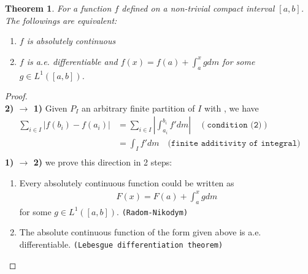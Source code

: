 \documentclass[a4paper,11pt,fleqn]{book}
\newtheorem{theorem}{Theorem}[section]
\theoremstyle{definition}
\theoremstyle{remark}
\begin{document}
\begin{theorem}
For a function $f$ defined on a non-trivial compact interval $[a, b]$. The followings are equivalent:
\begin{enumerate}
	\item $f$ is absolutely continuous
	\item $f$ is a.e. differentiable and $f(x) = f(a) + \int_a^x gdm$ for some $g \in L^1([a, b])$. 
\end{enumerate}
\end{theorem}
\begin{proof}\quad\\
\textbf{2) $\rightarrow$ 1)}
Given $P_I$ an arbitrary finite partition of $I$ with , we have
\begin{align*}
	\sum_{i \in I} |f(b_i) - f(a_i)| &= \sum_{i \in I}|\int_{a_i}^{b_i} f'dm|\quad(\texttt{condition (2)})\\
	&= \int_If'dm \quad \texttt{(finite additivity of integral)}  \\
	&
\end{align*}
\textbf{1) $\rightarrow$ 2)} we prove this direction in 2 steps:
\begin{enumerate}
	\item Every absolutely continuous function could be written as 
		\begin{align*}
			F(x) = F(a) + \int_a^x gdm 
		\end{align*}
		for some $g \in L^1([a, b])$. \texttt{(Radom-Nikodym)}
	\item The absolute continuous function of the form given above is a.e. differentiable. \texttt{(Lebesgue differentiation theorem)}
\end{enumerate}
\end{proof}
\end{document}
